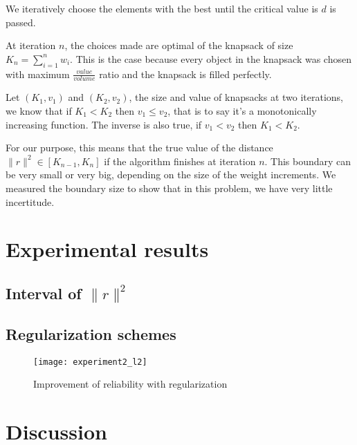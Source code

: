 \documentclass{article} %
\begin{document}
We iteratively choose the elements with the best until
the critical value is $d$ is passed.

At iteration $n$, the choices made are optimal of the knapsack of size
$K_n = \sum\limits_{i=1}^n w_i$. This is the case because every object in the
knapsack was chosen with maximum $\frac{value} {volume}$ ratio and the knapsack
is filled perfectly.

Let $(K_1, v_1)$ and $(K_2, v_2)$, the size and value of knapsacks at two
iterations, we know that if $K_1 < K_2$ then $v_1 \leq v_2$, that is to say
it's a monotonically increasing function. The inverse is also true, if
$v_1 < v_2$ then $K_1 < K_2$.

For our purpose, this means that the true value of the distance
$\lVert{r} \rVert^2 \in [K_{n-1}, K_n]$ if the algorithm finishes at iteration
$n$. This boundary can be very small or very big, depending on the size of the
weight increments. We measured the boundary size to show that in this problem,
we have very little incertitude.



\section{Experimental results}

\subsection{Interval of $\lVert{r} \rVert^2$}


\subsection{Regularization schemes}



\begin{figure}
\texttt{[image: experiment2\_l2]}
\caption{\small Improvement of reliability with regularization}
\end{figure}


\section{Discussion}
\end{document}
